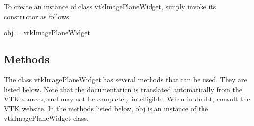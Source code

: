 To create an instance of class vtk\-Image\-Plane\-Widget, simply invoke its constructor as follows \begin{DoxyVerb}  obj = vtkImagePlaneWidget
\end{DoxyVerb}
 \hypertarget{vtkwidgets_vtkxyplotwidget_Methods}{}\subsection{Methods}\label{vtkwidgets_vtkxyplotwidget_Methods}
The class vtk\-Image\-Plane\-Widget has several methods that can be used. They are listed below. Note that the documentation is translated automatically from the V\-T\-K sources, and may not be completely intelligible. When in doubt, consult the V\-T\-K website. In the methods listed below, {\ttfamily obj} is an instance of the vtk\-Image\-Plane\-Widget class. 
